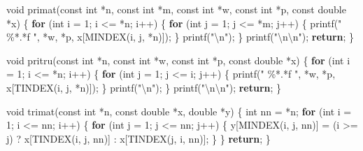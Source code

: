 \documentclass[
  12pt,
]{book}
\newenvironment{Shaded}{\begin{snugshade}}{\end{snugshade}}
\newcommand{\ControlFlowTok}[1]{\textcolor[rgb]{0.13,0.29,0.53}{\textbf{#1}}}
\newcommand{\DataTypeTok}[1]{\textcolor[rgb]{0.13,0.29,0.53}{#1}}
\newcommand{\DecValTok}[1]{\textcolor[rgb]{0.00,0.00,0.81}{#1}}
\newcommand{\NormalTok}[1]{#1}
\newcommand{\SpecialCharTok}[1]{\textcolor[rgb]{0.00,0.00,0.00}{#1}}
\newcommand{\StringTok}[1]{\textcolor[rgb]{0.31,0.60,0.02}{#1}}
\theoremstyle{definition}
\theoremstyle{definition}
\theoremstyle{definition}
\theoremstyle{definition}
\theoremstyle{remark}
\begin{document}
\begin{Shaded}
\begin{Highlighting}[]
\DataTypeTok{void}\NormalTok{ primat(}\DataTypeTok{const} \DataTypeTok{int}\NormalTok{ *n, }\DataTypeTok{const} \DataTypeTok{int}\NormalTok{ *m, }\DataTypeTok{const} \DataTypeTok{int}\NormalTok{ *w, }\DataTypeTok{const} \DataTypeTok{int}\NormalTok{ *p,}
            \DataTypeTok{const} \DataTypeTok{double}\NormalTok{ *x) \{}
    \ControlFlowTok{for}\NormalTok{ (}\DataTypeTok{int}\NormalTok{ i = }\DecValTok{1}\NormalTok{; i \textless{}= *n; i++) \{}
        \ControlFlowTok{for}\NormalTok{ (}\DataTypeTok{int}\NormalTok{ j = }\DecValTok{1}\NormalTok{; j \textless{}= *m; j++) \{}
\NormalTok{            printf(}\StringTok{" \%*.*f "}\NormalTok{, *w, *p, x[MINDEX(i, j, *n)]);}
\NormalTok{        \}}
\NormalTok{        printf(}\StringTok{"}\SpecialCharTok{\textbackslash{}n}\StringTok{"}\NormalTok{);}
\NormalTok{    \}}
\NormalTok{    printf(}\StringTok{"}\SpecialCharTok{\textbackslash{}n\textbackslash{}n}\StringTok{"}\NormalTok{);}
    \ControlFlowTok{return}\NormalTok{;}
\NormalTok{\}}

\DataTypeTok{void}\NormalTok{ pritru(}\DataTypeTok{const} \DataTypeTok{int}\NormalTok{ *n, }\DataTypeTok{const} \DataTypeTok{int}\NormalTok{ *w, }\DataTypeTok{const} \DataTypeTok{int}\NormalTok{ *p, }\DataTypeTok{const} \DataTypeTok{double}\NormalTok{ *x) \{}
    \ControlFlowTok{for}\NormalTok{ (}\DataTypeTok{int}\NormalTok{ i = }\DecValTok{1}\NormalTok{; i \textless{}= *n; i++) \{}
        \ControlFlowTok{for}\NormalTok{ (}\DataTypeTok{int}\NormalTok{ j = }\DecValTok{1}\NormalTok{; j \textless{}= i; j++) \{}
\NormalTok{            printf(}\StringTok{" \%*.*f "}\NormalTok{, *w, *p, x[TINDEX(i, j, *n)]);}
\NormalTok{        \}}
\NormalTok{        printf(}\StringTok{"}\SpecialCharTok{\textbackslash{}n}\StringTok{"}\NormalTok{);}
\NormalTok{    \}}
\NormalTok{    printf(}\StringTok{"}\SpecialCharTok{\textbackslash{}n\textbackslash{}n}\StringTok{"}\NormalTok{);}
    \ControlFlowTok{return}\NormalTok{;}
\NormalTok{\}}

\DataTypeTok{void}\NormalTok{ trimat(}\DataTypeTok{const} \DataTypeTok{int}\NormalTok{ *n, }\DataTypeTok{const} \DataTypeTok{double}\NormalTok{ *x, }\DataTypeTok{double}\NormalTok{ *y) \{}
    \DataTypeTok{int}\NormalTok{ nn = *n;}
    \ControlFlowTok{for}\NormalTok{ (}\DataTypeTok{int}\NormalTok{ i = }\DecValTok{1}\NormalTok{; i \textless{}= nn; i++) \{}
        \ControlFlowTok{for}\NormalTok{ (}\DataTypeTok{int}\NormalTok{ j = }\DecValTok{1}\NormalTok{; j \textless{}= nn; j++) \{}
\NormalTok{            y[MINDEX(i, j, nn)] =}
\NormalTok{                (i \textgreater{}= j) ? x[TINDEX(i, j, nn)] : x[TINDEX(j, i, nn)];}
\NormalTok{        \}}
\NormalTok{    \}}
    \ControlFlowTok{return}\NormalTok{;}
\NormalTok{\}}


\end{Highlighting}
\end{Shaded}
\end{document}
